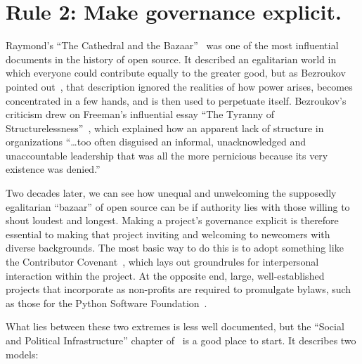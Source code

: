 \documentclass[10pt,letterpaper]{article}
\newcommand{\rulemajor}[1]{\section*{#1}}
\begin{document}
\rulemajor{Rule 2: Make governance explicit.}

Raymond's ``The Cathedral and the Bazaar''~\cite{raymond2001}
was one of the most influential documents in the history of open source.
It described an egalitarian world in which everyone could contribute equally to the greater good,
but as Bezroukov pointed out~\cite{bezroukov1999},
that description ignored the realities of how power arises,
becomes concentrated in a few hands,
and is then used to perpetuate itself.
Bezroukov's criticism drew on Freeman's influential essay ``The Tyranny of Structurelessness''~\cite{freeman1972},
which explained how an apparent lack of structure in organizations ``{\ldots}too often disguised an informal,
unacknowledged and unaccountable leadership that was all the more pernicious because its very existence was denied.''

Two decades later,
we can see how unequal and unwelcoming the supposedly egalitarian ``bazaar'' of open source can be
if authority lies with those willing to shout loudest and longest.
Making a project's governance explicit is therefore essential to making that project inviting and welcoming to newcomers with diverse backgrounds.
The most basic way to do this is to adopt something like the Contributor Covenant~\cite{covenant},
which lays out groundrules for interpersonal interaction within the project.
At the opposite end,
large, well-established projects that incorporate as non-profits are required to promulgate bylaws,
such as those for the Python Software Foundation~\cite{psf-bylaws}.

What lies between these two extremes is less well documented,
but the ``Social and Political Infrastructure'' chapter of~\cite{fogel2005} is a good place to start.
It describes two models:
\end{document}

